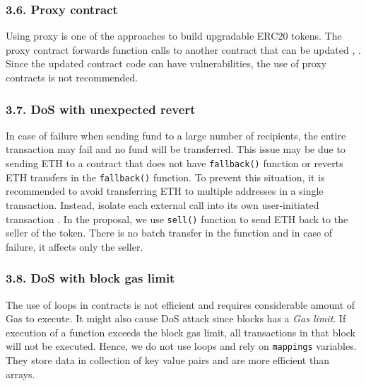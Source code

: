 \subsubsection*{3.6. Proxy contract}
Using proxy is one of the approaches to build upgradable ERC20 tokens. The proxy contract forwards function calls to another contract that can be updated \cite{ProxyContract}, \cite{ProxyPatterns}. Since the updated contract code can have vulnerabilities, the use of proxy contracts is not recommended.

\subsubsection*{3.7. DoS with unexpected revert}
In case of failure when sending fund to a large number of recipients, the entire transaction may fail and no fund will be transferred. This issue may be due to sending ETH to a contract that does not have \texttt{fallback()} function or reverts ETH transfers in the \texttt{fallback()} function. To prevent this situation, it is recommended to avoid transferring ETH to multiple addresses in a single transaction. Instead, isolate each external call into its own user-initiated transaction \cite{DosRevert}. In the proposal, we use \texttt{sell()} function to send ETH back to the seller of the token. There is no batch transfer in the function and in case of failure, it affects only the seller.

\subsubsection*{3.8. DoS with block gas limit}
The use of loops in contracts is not efficient and requires considerable amount of Gas to execute. It might also cause DoS attack since blocks has a \textit{Gas limit}. If execution of a function exceeds the block gas limit, all transactions in that block will not be executed. Hence, we do not use loops and rely on \texttt{mappings} variables. They store data in collection of key value pairs and are more efficient than arrays.